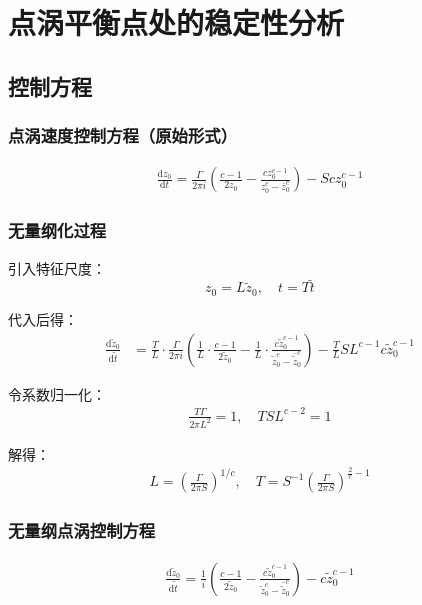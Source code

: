 \section{点涡平衡点处的稳定性分析}
\subsection{控制方程}
\subsubsection{点涡速度控制方程（原始形式）}
\begin{align}
    \frac{\mathrm{d}z_{0}}{\mathrm{d}t}=\frac{\Gamma}{2\pi i}\left( \frac{c-1}{2z_{0}} - \frac{cz_{0}^{c-1}}{z_{0}^{c}-\bar{z}_{0}^{c}} \right) - Scz_{0}^{c-1}
\end{align}

\subsubsection{无量纲化过程}

引入特征尺度：
\[
z_0 = L \tilde{z}_0, \quad t = T \tilde{t}
\]

代入后得：
\begin{align*}
    \frac{\mathrm{d}\tilde{z}_{0}}{\mathrm{d}\tilde{t}} &= \frac{T}{L} \cdot \frac{\Gamma}{2\pi i} \left( \frac{1}{L} \cdot \frac{c-1}{2\tilde{z}_0} - \frac{1}{L} \cdot \frac{c\tilde{z}_0^{c-1}}{\tilde{z}_0^c - \bar{\tilde{z}}_0^c} \right) - \frac{T}{L} SL^{c-1} c\tilde{z}_0^{c-1}
\end{align*}

令系数归一化：
\begin{align*}
    \frac{T\Gamma}{2\pi L^{2}}=1, \quad TSL^{c-2}=1
\end{align*}

解得：
\begin{align*}
    L = \left( \frac{\Gamma}{2\pi S} \right)^{1/c}, \quad
    T = S^{-1} \left( \frac{\Gamma}{2\pi S} \right)^{\frac{2}{c} - 1}
\end{align*}

\subsubsection{无量纲点涡控制方程}

\begin{align}
    \boxed{
    \frac{\mathrm{d}\tilde{z}_{0}}{\mathrm{d}\tilde{t}} = \frac{1}{i} \left( \frac{c-1}{2\tilde{z}_0} - \frac{c\tilde{z}_0^{c-1}}{\tilde{z}_0^c - \bar{\tilde{z}}_0^c} \right) - c \tilde{z}_0^{c-1}
    }
\end{align}

